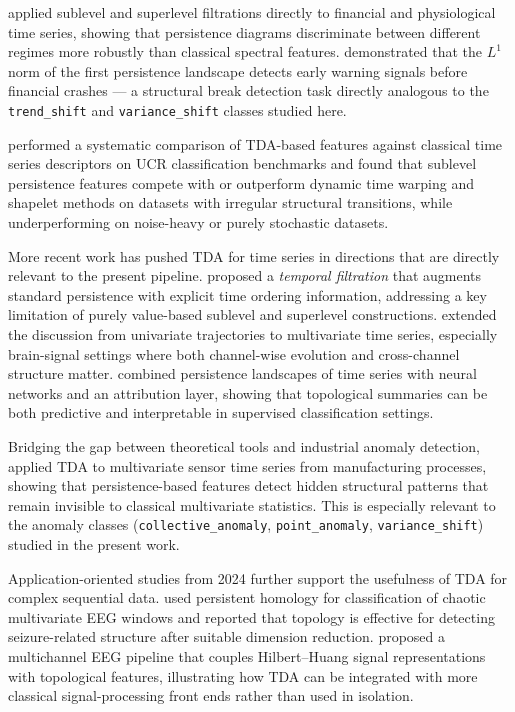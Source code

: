 \documentclass[12pt, a4paper]{article}
\theoremstyle{definition}
\theoremstyle{plain}
\begin{document}
\citet{umeda2017time} applied sublevel and superlevel filtrations directly to
financial and physiological time series, showing that persistence diagrams
discriminate between different regimes more robustly than classical spectral
features. \citet{gidea2018topological} demonstrated that the $L^1$ norm of the
first persistence landscape detects early warning signals before financial crashes
— a structural break detection task directly analogous to the \texttt{trend\_shift}
and \texttt{variance\_shift} classes studied here.

\citet{seversky2016time} performed a systematic comparison of TDA-based features
against classical time series descriptors on UCR classification benchmarks and
found that sublevel persistence features compete with or outperform dynamic time
warping and shapelet methods on datasets with irregular structural transitions,
while underperforming on noise-heavy or purely stochastic datasets.

More recent work has pushed TDA for time series in directions that are directly
relevant to the present pipeline. \citet{lin2022temporal} proposed a
\emph{temporal filtration} that augments standard persistence with explicit time
ordering information, addressing a key limitation of purely value-based sublevel
and superlevel constructions. \citet{elyaagoubi2023multivariate} extended the
discussion from univariate trajectories to multivariate time series, especially
brain-signal settings where both channel-wise evolution and cross-channel
structure matter. \citet{ferra2023importance} combined persistence landscapes of
time series with neural networks and an attribution layer, showing that
topological summaries can be both predictive and interpretable in supervised
classification settings.

Bridging the gap between theoretical tools and industrial anomaly detection,
\citet{perez2021topological} applied TDA to multivariate sensor time series from
manufacturing processes, showing that persistence-based features detect hidden
structural patterns that remain invisible to classical multivariate statistics.
This is especially relevant to the anomaly classes (\texttt{collective\_anomaly},
\texttt{point\_anomaly}, \texttt{variance\_shift}) studied in the present work.

Application-oriented studies from 2024 further support the usefulness of TDA for
complex sequential data. \citet{flammer2024chaotic} used persistent homology for
classification of chaotic multivariate EEG windows and reported that topology is
effective for detecting seizure-related structure after suitable dimension
reduction. \citet{zheng2024multivariate} proposed a multichannel EEG pipeline
that couples Hilbert--Huang signal representations with topological features,
illustrating how TDA can be integrated with more classical signal-processing
front ends rather than used in isolation.
\end{document}

